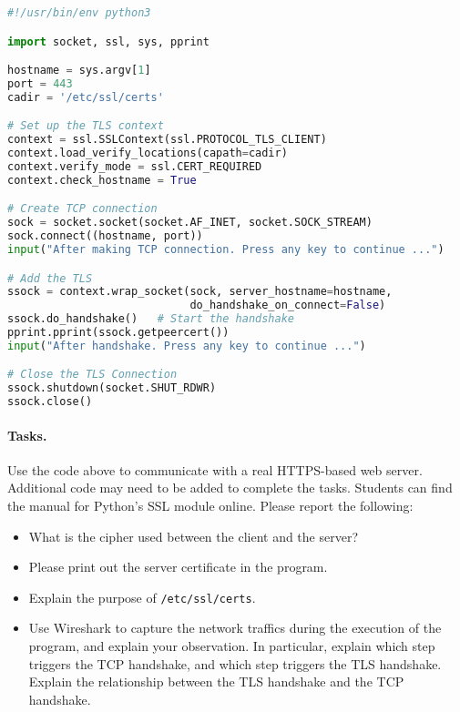 \begin{lstlisting}[caption={\texttt{handshake.py} (in \texttt{Labsetup/volumes})}, 
                   label={tls:handshake},language=Python]
#!/usr/bin/env python3

import socket, ssl, sys, pprint

hostname = sys.argv[1]
port = 443
cadir = '/etc/ssl/certs'   

# Set up the TLS context 
context = ssl.SSLContext(ssl.PROTOCOL_TLS_CLIENT) 
context.load_verify_locations(capath=cadir)
context.verify_mode = ssl.CERT_REQUIRED
context.check_hostname = True

# Create TCP connection 
sock = socket.socket(socket.AF_INET, socket.SOCK_STREAM)
sock.connect((hostname, port))
input("After making TCP connection. Press any key to continue ...")

# Add the TLS 
ssock = context.wrap_socket(sock, server_hostname=hostname,
                            do_handshake_on_connect=False)
ssock.do_handshake()   # Start the handshake
pprint.pprint(ssock.getpeercert())
input("After handshake. Press any key to continue ...")

# Close the TLS Connection
ssock.shutdown(socket.SHUT_RDWR)
ssock.close()
\end{lstlisting}
 



\paragraph{Tasks.} Use the code above to communicate with a real HTTPS-based web server.
Additional code may need to be added to complete the tasks. Students can find the manual
for Python's SSL module online.  Please report the following:
\begin{itemize}
\item What is the cipher used between the client and the server? 
\item Please print out the server certificate in the program.
\item Explain the purpose of \texttt{/etc/ssl/certs}.
\item Use Wireshark to capture the network traffics during the 
execution of the program, and explain your observation. In particular,
explain which step triggers the TCP handshake, and which
step triggers the TLS handshake. Explain the relationship between
 the TLS handshake and the TCP handshake. 
\end{itemize}
 


